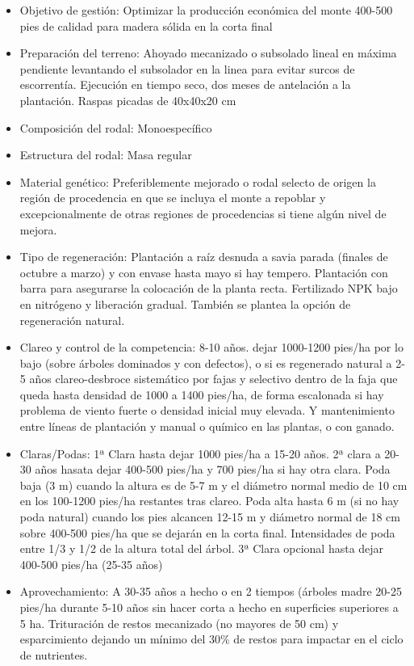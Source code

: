 \documentclass[]{article}
\begin{document}
\begin{itemize}
\item
  Objetivo de gestión: Optimizar la producción económica del monte
  400-500 pies de calidad para madera sólida en la corta final
\item
  Preparación del terreno: Ahoyado mecanizado o subsolado lineal en
  máxima pendiente levantando el subsolador en la linea para evitar
  surcos de escorrentía. Ejecución en tiempo seco, dos meses de
  antelación a la plantación. Raspas picadas de 40x40x20 cm
\item
  Composición del rodal: Monoespecífico
\item
  Estructura del rodal: Masa regular
\item
  Material genético: Preferiblemente mejorado o rodal selecto de origen
  la región de procedencia en que se incluya el monte a repoblar y
  excepcionalmente de otras regiones de procedencias si tiene algún
  nivel de mejora.
\item
  Tipo de regeneración: Plantación a raíz desnuda a savia parada
  (finales de octubre a marzo) y con envase hasta mayo si hay tempero.
  Plantación con barra para asegurarse la colocación de la planta recta.
  Fertilizado NPK bajo en nitrógeno y liberación gradual. También se
  plantea la opción de regeneración natural.
\item
  Clareo y control de la competencia: 8-10 años. dejar 1000-1200 pies/ha
  por lo bajo (sobre árboles dominados y con defectos), o si es
  regenerado natural a 2-5 años clareo-desbroce sistemático por fajas y
  selectivo dentro de la faja que queda hasta densidad de 1000 a 1400
  pies/ha, de forma escalonada si hay problema de viento fuerte o
  densidad inicial muy elevada. Y mantenimiento entre líneas de
  plantación y manual o químico en las plantas, o con ganado.
\item
  Claras/Podas: 1ª Clara hasta dejar 1000 pies/ha a 15-20 años. 2ª clara
  a 20-30 años hasata dejar 400-500 pies/ha y 700 pies/ha si hay otra
  clara. Poda baja (3 m) cuando la altura es de 5-7 m y el diámetro
  normal medio de 10 cm en los 100-1200 pies/ha restantes tras clareo.
  Poda alta hasta 6 m (si no hay poda natural) cuando los pies alcancen
  12-15 m y diámetro normal de 18 cm sobre 400-500 pies/ha que se
  dejarán en la corta final. Intensidades de poda entre 1/3 y 1/2 de la
  altura total del árbol. 3ª Clara opcional hasta dejar 400-500 pies/ha
  (25-35 años)
\item
  Aprovechamiento: A 30-35 años a hecho o en 2 tiempos (árboles madre
  20-25 pies/ha durante 5-10 años sin hacer corta a hecho en superficies
  superiores a 5 ha. Trituración de restos mecanizado (no mayores de 50
  cm) y esparcimiento dejando un mínimo del 30\% de restos para impactar
  en el ciclo de nutrientes.
\end{itemize}
\end{document}

